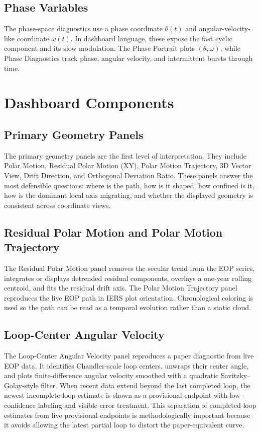 \documentclass[11pt]{article}
\begin{document}
\subsection{Phase Variables}
The phase-space diagnostics use a phase coordinate \(\theta(t)\) and angular-velocity-like coordinate \(\omega(t)\). In dashboard language, these expose the fast cyclic component and its slow modulation. The Phase Portrait plots \((\theta,\omega)\), while Phase Diagnostics track phase, angular velocity, and intermittent bursts through time.

\section{Dashboard Components}
\subsection{Primary Geometry Panels}
The primary geometry panels are the first level of interpretation. They include Polar Motion, Residual Polar Motion (XY), Polar Motion Trajectory, 3D Vector View, Drift Direction, and Orthogonal Deviation Ratio. These panels answer the most defensible questions: where is the path, how is it shaped, how confined is it, how is the dominant local axis migrating, and whether the displayed geometry is consistent across coordinate views.

\subsection{Residual Polar Motion and Polar Motion Trajectory}
The Residual Polar Motion panel removes the secular trend from the EOP series, integrates or displays detrended residual components, overlays a one-year rolling centroid, and fits the residual drift axis. The Polar Motion Trajectory panel reproduces the live EOP path in IERS plot orientation. Chronological coloring is used so the path can be read as a temporal evolution rather than a static cloud.

\subsection{Loop-Center Angular Velocity}
The Loop-Center Angular Velocity panel reproduces a paper diagnostic from live EOP data. It identifies Chandler-scale loop centers, unwraps their center angle, and plots finite-difference angular velocity smoothed with a quadratic Savitzky--Golay-style filter. When recent data extend beyond the last completed loop, the newest incomplete-loop estimate is shown as a provisional endpoint with low-confidence labeling and visible error treatment. This separation of completed-loop estimates from live provisional endpoints is methodologically important because it avoids allowing the latest partial loop to distort the paper-equivalent curve.
\end{document}
